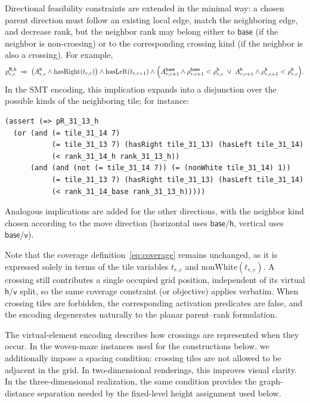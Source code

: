 \documentclass[acmsmall,screen,nonacm]{acmart}
\newcommand{\kind}[1]{\mathsf{#1}}
\begin{document}
Directional feasibility constraints are extended in the minimal way: a
chosen parent direction must follow an existing local edge, match the
neighboring edge, and decrease rank, but the neighbor rank may belong
either to \(\kind{base}\) (if the neighbor is non-crossing) or to the
corresponding crossing kind (if the neighbor is also a crossing). For
example,
\[
p^{\kind{R},\kind{h}}_{r,c}\;\Rightarrow\;
\bigl(A^{\kind{h}}_{r,c}\wedge \mathrm{hasRight}(t_{r,c})\bigr)
\wedge
\mathrm{hasLeft}(t_{r,c+1})
\wedge
\Bigl(
A^{\kind{base}}_{r,c+1}\wedge \rho^{\kind{base}}_{r,c+1}<\rho^{\kind{h}}_{r,c}
\;\vee\;
A^{\kind{h}}_{r,c+1}\wedge \rho^{\kind{h}}_{r,c+1}<\rho^{\kind{h}}_{r,c}
\Bigr).
\]
In the SMT encoding, this implication expands into a disjunction over
the possible kinds of the neighboring tile; for instance:
\begin{tcolorbox}[smtsimple]
\begin{verbatim}
(assert (=> pR_31_13_h
  (or (and (= tile_31_14 7)
           (= tile_31_13 7) (hasRight tile_31_13) (hasLeft tile_31_14)
           (< rank_31_14_h rank_31_13_h))
      (and (and (not (= tile_31_14 7)) (= (nonWhite tile_31_14) 1))
           (= tile_31_13 7) (hasRight tile_31_13) (hasLeft tile_31_14)
           (< rank_31_14_base rank_31_13_h)))))
\end{verbatim}
\end{tcolorbox}

Analogous implications are added for the other directions, with the
neighbor kind chosen according to the move direction (horizontal uses
\(\kind{base}/\kind{h}\), vertical uses \(\kind{base}/\kind{v}\)).

Note that the coverage definition~\eqref{eq:coverage} remains
unchanged, as it is expressed solely in terms of the tile variables
\(t_{r,c}\) and \(\mathrm{nonWhite}(t_{r,c})\). A crossing still
contributes a single occupied grid position, independent of its
virtual \(\kind{h}/\kind{v}\) split, so the same coverage constraint
(or objective) applies verbatim. When crossing tiles are forbidden,
the corresponding activation predicates are false, and the encoding
degenerates naturally to the planar parent--rank formulation.

The virtual-element encoding describes how crossings are represented
when they occur. In the woven-maze instances used for the constructions
below, we additionally impose a spacing condition: crossing tiles are
not allowed to be adjacent in the grid. In two-dimensional renderings,
this improves visual clarity. In the three-dimensional realization,
the same condition provides the graph-distance separation needed by
the fixed-level height assignment used below.
\end{document}
